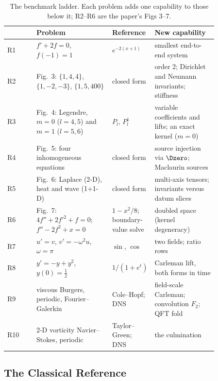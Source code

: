 \begin{table}[htbp]
    \centering
    \caption{The benchmark ladder. Each problem adds one capability to those below it; R2--R6 are the paper's Figs 3--7.}
    \label{tab:ladder}
    \small
    \begin{tabular}{@{}l p{0.36\linewidth} p{0.2\linewidth} p{0.3\linewidth}@{}}
        \toprule
        & Problem & Reference & New capability \\
        \midrule
        R1 & $f' + 2f = 0$, $f(-1) = 1$ & $e^{-2(x+1)}$ & smallest end-to-end system \\
        R2 & Fig.~3: $\{1,4,4\}$, $\{1,-2,-3\}$, $\{1,5,400\}$ & closed form & order 2; Dirichlet and Neumann invariants; stiffness \\
        R3 & Fig.~4: Legendre, $m=0$ ($l=4,5$) and $m=1$ ($l=5,6$) & $P_l$, $P_l^1$ & variable coefficients and lifts; an exact kernel ($m=0$) \\
        R4 & Fig.~5: four inhomogeneous equations & closed form & source injection via $\Dzero$; Maclaurin sources \\
        R5 & Fig.~6: Laplace (2-D), heat and wave (1+1-D) & closed form & multi-axis tensors; invariants versus datum slices \\
        R6 & Fig.~7: $4f'' + 2f'^2 + f = 0$; $f'' - 2f^2 + x = 0$ & $1 - x^2/8$; boundary-value solve & doubled space (kernel degeneracy) \\
        R7 & $u' = v$, $v' = -\omega^2 u$, $\omega = \pi$ & $\sin$, $\cos$ & two fields; ratio rows \\
        R8 & $y' = -y + y^2$, $y(0) = \tfrac12$ & $1/(1+e^{t})$ & Carleman lift, both forms in time \\
        R9 & viscous Burgers, periodic, Fourier--Galerkin & Cole--Hopf; DNS & field-scale Carleman; convolution $F_2$; QFT fold \\
        R10 & 2-D vorticity Navier--Stokes, periodic & Taylor--Green; DNS & the culmination \\
        \bottomrule
    \end{tabular}
\end{table}

\subsection{The Classical Reference}
\label{sec:pipeline-reference}

